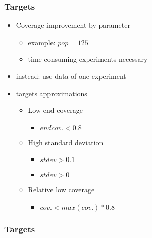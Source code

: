 \begin{frame}
	\frametitle{Targets}
	
	\begin{itemize}
		\item Coverage improvement by parameter
		\begin{itemize}
			\item example: $pop = 125$
			\item time-consuming experiments necessary
		\end{itemize} 
		\item instead: use data of one experiment
		\item targets approximations
		\begin{itemize}
			\item Low end coverage
			\begin{itemize}
				\item $endcov. < 0.8$
			\end{itemize} 
			\item High standard deviation 
			\begin{itemize}
				\item $stdev > 0.1$
				\item $stdev > 0$
			\end{itemize} 
			\item Relative low coverage 
			\begin{itemize}
				\item $cov. < max(cov.) * 0.8$
			\end{itemize} 
		\end{itemize} 
	\end{itemize}
	
\end{frame}

\begin{frame}
	\frametitle{Targets}
	
	\begin{table}
		\centering
		\resizebox{\textwidth}{!}{}
	\end{table}
	
\end{frame}